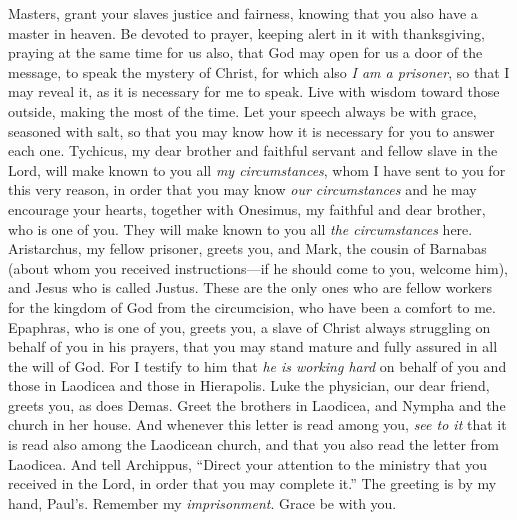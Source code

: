 \begin{biblechapter} %
\verse Masters, grant your slaves justice and fairness, knowing that you also have a master in heaven.
 Be devoted to prayer, keeping alert in it with thanksgiving,
\verse praying at the same time for us also, that God may open for us a door of the message, to speak the mystery of Christ, for which also \textit{I am a prisoner},
\verse so that I may reveal it, as it is necessary for me to speak.
\verse Live with wisdom toward those outside, making the most of the time.
\verse Let your speech always be with grace, seasoned with salt, so that you may know how it is necessary for you to answer each one.
 Tychicus, my dear brother and faithful servant and fellow slave in the Lord, will make known to you all \textit{my circumstances},
\verse whom I have sent to you for this very reason, in order that you may know \textit{our circumstances} and he may encourage your hearts,
\verse together with Onesimus, my faithful and dear brother, who is one of you. They will make known to you all \textit{the circumstances} here.
\verse Aristarchus, my fellow prisoner, greets you, and Mark, the cousin of Barnabas (about whom you received instructions—if he should come to you, welcome him),
\verse and Jesus who is called Justus. These are the only ones who are fellow workers for the kingdom of God from the circumcision, who have been a comfort to me.
\verse Epaphras, who is one of you, greets you, a slave of Christ always struggling on behalf of you in his prayers, that you may stand mature and fully assured in all the will of God.
\verse For I testify to him that \textit{he is working hard} on behalf of you and those in Laodicea and those in Hierapolis.
\verse Luke the physician, our dear friend, greets you, as does Demas.
\verse Greet the brothers in Laodicea, and Nympha and the church in her house.
\verse And whenever this letter is read among you, \textit{see to it} that it is read also among the Laodicean church, and that you also read the letter from Laodicea.
\verse And tell Archippus, “Direct your attention to the ministry that you received in the Lord, in order that you may complete it.”
 The greeting is by my hand, Paul’s. Remember my \textit{imprisonment}. Grace be with you.
\end{biblechapter}

